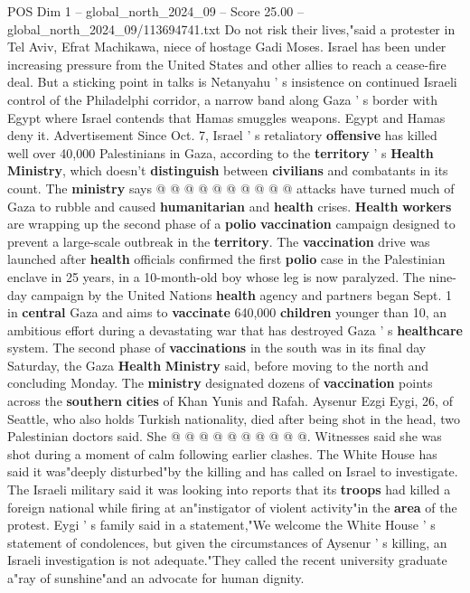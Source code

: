 \begin{textsample}{POS Dim 1 – global\_north\_2024\_09 – Score 25.00 – global\_north\_2024\_09/113694741.txt}
Do not risk their lives,"said a protester in Tel Aviv, Efrat Machikawa, niece of hostage Gadi Moses.
Israel has been under increasing pressure from the United States and other allies to reach a cease-fire deal.
But a sticking point in talks is Netanyahu ' s insistence on continued Israeli control of the Philadelphi corridor, a narrow band along Gaza ' s border with Egypt where Israel contends that Hamas smuggles weapons.
Egypt and Hamas deny it.
Advertisement Since Oct. 7, Israel ' s retaliatory \textbf{offensive} has killed well over 40,000 Palestinians in Gaza, according to the \textbf{territory} ' s \textbf{Health} \textbf{Ministry}, which doesn't \textbf{distinguish} between \textbf{civilians} and combatants in its count.
The \textbf{ministry} says @ @ @ @ @ @ @ @ @ @ attacks have turned much of Gaza to rubble and caused \textbf{humanitarian} and \textbf{health} crises. \textbf{Health} \textbf{workers} are wrapping up the second phase of a \textbf{polio} \textbf{vaccination} campaign designed to prevent a large-scale outbreak in the \textbf{territory}.
The \textbf{vaccination} drive was launched after \textbf{health} officials confirmed the first \textbf{polio} case in the Palestinian enclave in 25 years, in a 10-month-old boy whose leg is now paralyzed.
The nine-day campaign by the United Nations \textbf{health} agency and partners began Sept. 1 in \textbf{central} Gaza and aims to \textbf{vaccinate} 640,000 \textbf{children} younger than 10, an ambitious effort during a devastating war that has destroyed Gaza ' s \textbf{healthcare} system.
The second phase of \textbf{vaccinations} in the south was in its final day Saturday, the Gaza \textbf{Health} \textbf{Ministry} said, before moving to the north and concluding Monday.
The \textbf{ministry} designated dozens of \textbf{vaccination} points across the \textbf{southern} \textbf{cities} of Khan Yunis and Rafah.
Aysenur Ezgi Eygi, 26, of Seattle, who also holds Turkish nationality, died after being shot in the head, two Palestinian doctors said.
She @ @ @ @ @ @ @ @ @ @.
Witnesses said she was shot during a moment of calm following earlier clashes.
The White House has said it was"deeply disturbed"by the killing and has called on Israel to investigate.
The Israeli military said it was looking into reports that its \textbf{troops} had killed a foreign national while firing at an"instigator of violent activity"in the \textbf{area} of the protest.
Eygi ' s family said in a statement,"We welcome the White House ' s statement of condolences, but given the circumstances of Aysenur ' s killing, an Israeli investigation is not adequate."They called the recent university graduate a"ray of sunshine"and an advocate for human dignity.

\end{textsample}
